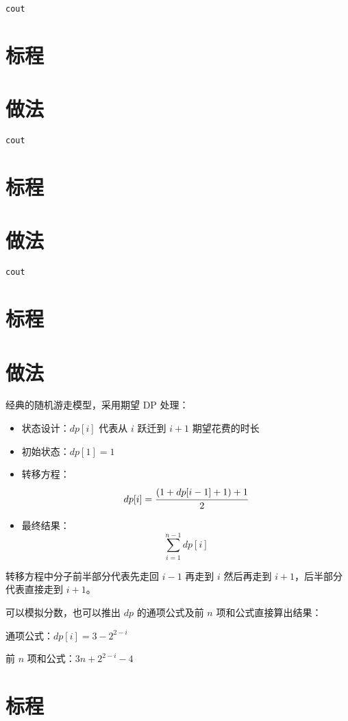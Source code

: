 \documentclass{../cpct/ctsol}
\begin{document}
\verb|cout|

\section*{标程}


\makesolution
\section*{做法}

\verb|cout|

\section*{标程}


\makesolution
\section*{做法}

\verb|cout|

\section*{标程}


\makesolution
\section*{做法}

经典的随机游走模型，采用期望 DP 处理：

\begin{itemize}
    \item 状态设计：$dp[i]$ 代表从 $i$ 跃迁到 $i+1$ 期望花费的时长
    \item 初始状态：$dp[1] = 1$
    \item 转移方程：$$dp[i] = \cfrac{(1+dp[i-1]+1)+1}{2}$$
    \item 最终结果：$$\sum\limits_{i=1}^{n-1} dp[i]$$
\end{itemize}

转移方程中分子前半部分代表先走回 $i-1$ 再走到 $i$ 然后再走到 $i+1$，后半部分代表直接走到 $i+1$。

可以模拟分数，也可以推出 $dp$ 的通项公式及前 $n$ 项和公式直接算出结果：

通项公式：$dp[i] = 3-2^{2-i}$

前 $n$ 项和公式：$3n+2^{2-i}-4$

\section*{标程}

\end{document}
